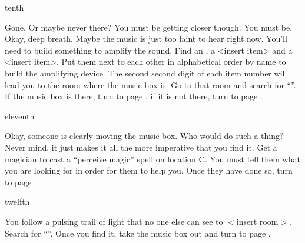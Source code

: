 \documentclass[greennotebook]{NeptuneBall}
\begin{document}
\begin{page}{tenth}

Gone. Or maybe never there? You must be getting closer though. You must be. Okay, deep breath. Maybe the music is just too faint to hear right now. You'll need to build something to amplify the sound. Find an \iConch{}, a <insert item> and a <insert item>. Put them next to each other in alphabetical order by name to build the amplifying device. The second second digit of each item number will lead you to the room where the music box is. Go to that room and search for ``\sPacketC{}''. If the music box is there, turn to page , if it is not there, turn to page .

\end{page}

\begin{page}{eleventh}

Okay, someone is clearly moving the music box. Who would do such a thing? Never mind, it just makes it all the more imperative that you find it. Get a magician to cast a ``perceive magic'' spell on location C. You must tell them what you are looking for in order for them to help you. Once they have done so, turn to page .

\end{page}

\begin{page}{twelfth}

You follow a pulsing trail of light that no one else can see to $<$insert room$>$. Search for ``\sPacketD{}''. Once you find it, take the music box out and turn to page .

\end{page}

\endnotebook
\end{document}
